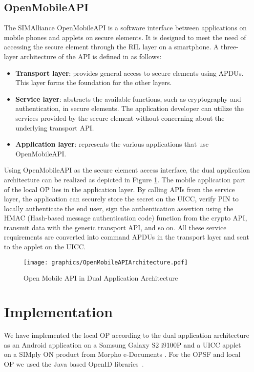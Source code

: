 \documentclass[runningheads,a4paper]{llncs}
\begin{document}
\subsection{OpenMobileAPI}
\label{subsec: openmobileapi}
The SIMAlliance OpenMobileAPI is a software interface between applications on mobile phones and applets on secure elements. It is designed to meet the need of accessing the secure element through the RIL layer on a smartphone. A three-layer architecture of the API is defined in \cite{OpenMobileAPI2} as follows:

\begin{itemize}
	\item \textbf{Transport layer}: provides general access to secure elements using APDUs. This layer forms the foundation for the other layers.
	\item \textbf{Service layer}: abstracts the available functions, such as cryptography and authentication, in secure elements. The application developer can utilize the services provided by the secure element without concerning about the underlying transport API.
	\item \textbf{Application layer}: represents the various applications that use OpenMobileAPI.
\end{itemize}

Using OpenMobileAPI as the secure element access interface, the dual application architecture can be realized as depicted in Figure \ref{fig:OpenMobileAPIArchitecture}. The mobile application part of the local OP lies in the application layer. By calling APIs from the service layer, the application can securely store the secret on the UICC, verify PIN to locally authenticate the end user, sign the authentication assertion using the HMAC (Hash-based message authentication code) function from the crypto API, transmit data with the generic transport API, and so on. All these service requirements are converted into command APDUs in the transport layer and sent to the applet on the UICC.


\begin{figure}[t]
	\centering
		\texttt{[image: graphics/OpenMobileAPIArchitecture.pdf]}
	\caption{Open Mobile API in Dual Application Architecture}
	\label{fig:OpenMobileAPIArchitecture}
\end{figure}


\section{Implementation}
\label{sec:demoimplementation}
We have implemented the local OP according to the dual application architecture as an Android application on a Samsung Galaxy S2 i9100P and a UICC applet on a SIMply ON product from Morpho e-Documents \cite{Documents}.
For the OPSF and local OP we used the Java based OpenID libraries~\cite{openid4java}.
\end{document}
